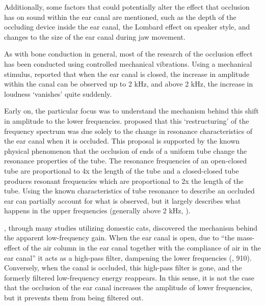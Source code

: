 Additionally, some factors that could potentially alter the effect that occlusion has on sound within the ear canal are mentioned, such as the depth of the occluding device inside the ear canal, the Lombard effect on speaker style, and changes to the size of the ear canal during jaw movement.

As with bone conduction in general, most of the research of the occlusion effect has been conducted using controlled mechanical vibrations.  Using a mechanical stimulus, \cite{bekesy:60} reported that when the ear canal is closed, the increase in amplitude within the canal can be observed up to 2 kHz, and above 2 kHz, the increase in loudness `vanishes' quite suddenly. %

Early on, the particular focus was to understand the mechanism behind this shift in amplitude to the lower frequencies. \cite{huizing:60} proposed that this `restructuring' of the frequency spectrum was due solely to the change in resonance characteristics of the ear canal when it is occluded.  This proposal is supported by the known physical phenomenon that the occlusion of ends of a uniform tube change the resonance properties of the tube. The resonance frequencies of an open-closed tube are proportional to 4x the length of the tube and a closed-closed tube produces resonant frequencies which are proportional to 2x the length of the tube.  Using the known characteristics of tube resonance to describe an occluded ear can partially account for what is observed, but it largely describes what happens in the upper frequencies (generally above 2 kHz, \cite{stenfelt:03}).  

\cite{tonndorf:66}, through many studies utilizing domestic cats,  discovered the mechanism behind the apparent low-frequency gain.  When the ear canal is open, due to ``the mass-effect of the air column in the ear canal together with the compliance of air in the ear canal'' it acts as a high-pass filter, dampening the lower frequencies (\cite{stenfelt:03}, 910).  Conversely, when the canal is occluded, this high-pass filter is gone, and the formerly filtered low-frequency energy reappears.  In this sense, it is not the case that the occlusion of the ear canal increases the amplitude of lower frequencies, but it prevents them from being filtered out.


